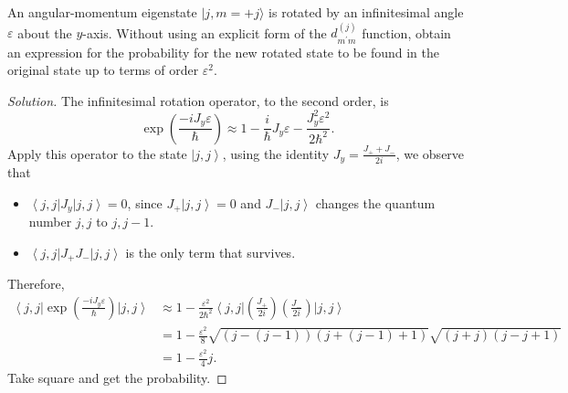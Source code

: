 
\begin{problem}
	An angular-momentum eigenstate $|j, m=+j\rangle$ is rotated by an infinitesimal angle $\varepsilon$ about the $y$-axis. Without using an explicit form of the $d_{m^{\prime} m}^{(j)}$ function, obtain an expression for the probability for the new rotated state to be found in the original state up to terms of order $\varepsilon^2$.
\end{problem}
\begin{proof}[Solution]
	The infinitesimal rotation operator, to the second order, is
	\[
		\exp\left( \frac{- i J_y \varepsilon}{\hbar} \right) \approx 1 - \frac{i}{\hbar} J_y \varepsilon - \frac{J_y^2 \varepsilon^2}{2\hbar^2}
	.\] 
	Apply this operator to the state  $\left| j,j \right\rangle $, using the identity $J_y = \frac{J_+ + J_-}{2 i}$, we observe that
	\begin{itemize}
		\item $\left\langle j,j \right| J_y \left| j,j \right\rangle = 0$, since $J_+ \left| j,j \right\rangle = 0$ and $J_- \left| j,j \right\rangle $ changes the quantum number $j,j$ to $j,j-1$.
		\item $\left\langle j,j \right| J_+ J_- \left| j,j \right\rangle $ is the only term that survives.
	\end{itemize}
	Therefore,
	\begin{align*}
		\left\langle j,j \right| \exp\left( \frac{- i J_y \varepsilon}{\hbar} \right) \left| j,j \right\rangle 
		&\approx 1 - \frac{\varepsilon^2}{2\hbar^2} \left\langle j,j \right| \left( \frac{J_+}{ 2i}  \right) \left( \frac{J_-}{2i} \right) \left| j,j \right\rangle  \\
		&= 1 - \frac{\varepsilon^2}{8} \sqrt{\left( j - (j- 1) \right) \left( j + (j - 1) + 1\right)} \sqrt{(j + j) (j - j + 1)}   \\
		&= 1 - \frac{\varepsilon^2}{4} j
	.\end{align*}
	Take square and get the probability.
\end{proof}



